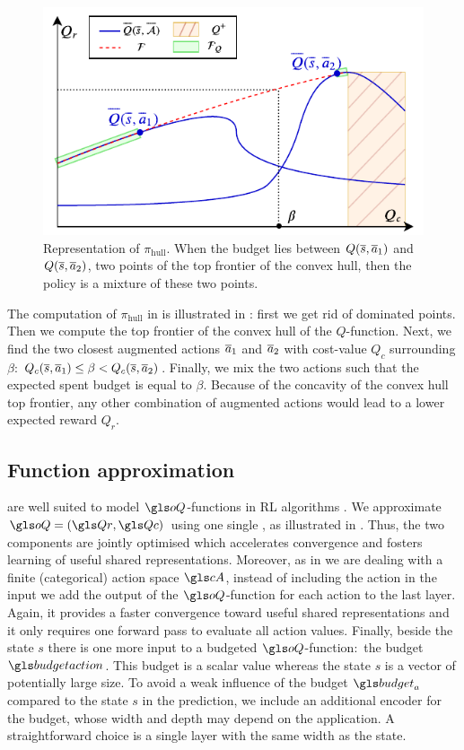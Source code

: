 \begin{figure}[t]
	\centering
	\includegraphics[width=0.6\linewidth]{img/pi.pdf}
	\caption{Representation of $\pi_\text{hull}$. When the budget lies between $Q(\overline{s},\overline{a}_1)$ and $Q(\overline{s},\overline{a}_2)$, two points of the top frontier of the convex hull, then the policy is a mixture of these two points.}
	\label{fig:hull}
\end{figure}

The computation of $\pi_\text{hull}$ in  is illustrated in : first we get rid of dominated points. Then we compute the top frontier of the convex hull of the $Q$-function. Next, we find the two closest augmented actions $\overline{a}_1$ and $\overline{a}_2$ with cost-value $Q_c$ surrounding $\beta$:  $Q_c(\overline{s},\overline{a}_1)\leq\beta<Q_c(\overline{s},\overline{a}_2)$. Finally, we mix the two actions such that the expected spent budget is equal to $\beta$. Because of the concavity of the convex hull top frontier, any other combination of augmented actions would lead to a lower expected reward $Q_r$. 




\subsection{Function approximation}

 are well suited to model $\oQ$-functions in \gls{RL} algorithms \citep{Mnih2015}. We approximate $\oQ = (\Qr, \Qc)$ using one single , as illustrated in . Thus, the two components are jointly optimised which accelerates convergence and fosters learning of useful shared representations. Moreover, as in \citep{Mnih2015} we are dealing with a finite (categorical) action space $\cA$, instead of including the action in the input we add the output of the $\oQ$-function for each action to the last layer. Again, it provides a faster convergence toward useful shared representations and it only requires one forward pass to evaluate all action values. Finally, beside the state $s$ there is one more input to a budgeted $\oQ$-function:~the budget $\budgetaction$. This budget is a scalar value whereas the state $s$ is a vector of potentially large size. To avoid a weak influence of the budget $\budget_a$ compared to the state $s$ in the prediction, we include an additional encoder for the budget, whose width and depth may depend on the application. A straightforward choice is a single layer with the same width as the state.

